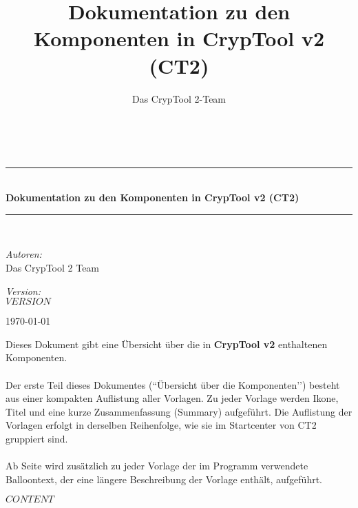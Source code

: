 \documentclass[10pt,a4paper]{scrreprt}
\title{Dokumentation zu den Komponenten in CrypTool v2 (CT2)}
\author{Das CrypTool 2-Team}
\newcommand{\HRule}{\rule{\linewidth}{0.5mm}}
\begin{document}
\begin{titlepage}
\begin{center}
\hspace{0pt}\\[2.5cm]

\HRule \\[0.4cm]
{ \huge \bfseries Dokumentation zu den Komponenten in CrypTool v2 (CT2) }\\[0.4cm]
\HRule \\[1.5cm]

\begin{minipage}{0.4\textwidth}
\begin{flushleft} \large
\emph{Autoren:} \\
Das CrypTool 2 Team
\end{flushleft}
\end{minipage}
\begin{minipage}{0.4\textwidth}
\begin{flushright} \large
\emph{Version:} \\
$VERSION$
\end{flushright}
\end{minipage}
\vfill
{\large \today}
\end{center}
\newpage
\large
Dieses Dokument gibt eine Übersicht über die in {\bf CrypTool v2} enthaltenen Komponenten.\\\\
Der erste Teil dieses Dokumentes (``Übersicht über die Komponenten’’) besteht aus einer kompakten Auflistung aller Vorlagen. Zu jeder Vorlage werden Ikone, Titel und eine kurze Zusammenfassung (Summary) aufgeführt. Die Auflistung der Vorlagen erfolgt in derselben Reihenfolge, wie sie im Startcenter von CT2 gruppiert sind.\\\\
Ab Seite \pageref{part2} wird zusätzlich zu jeder Vorlage der im Programm verwendete Balloontext, der eine längere Beschreibung der Vorlage enthält, aufgeführt.
\newpage
\end{titlepage}

\tableofcontents
\newpage

$CONTENT$
\end{document}
